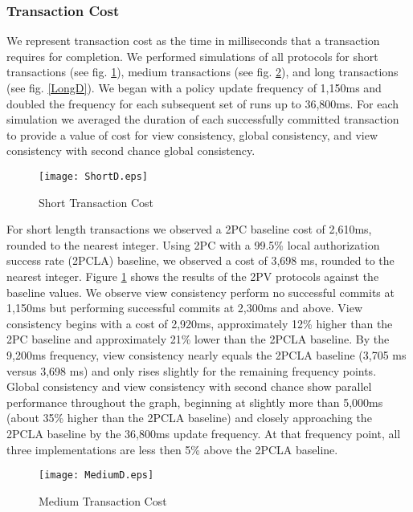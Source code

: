 \documentclass[11pt]{article}
\begin{document}
\subsubsection{Transaction Cost}
We represent transaction cost as the time in milliseconds that a transaction requires for completion. We performed simulations of all protocols for short transactions (see fig. \ref{ShortD}), medium transactions (see fig. \ref{MediumD}), and long transactions (see fig. \ref{LongD}). We began with a policy update frequency of 1,150ms and doubled the frequency for each subsequent set of runs up to 36,800ms. For each simulation we averaged the duration of each successfully committed transaction to provide a value of cost for view consistency, global consistency, and view consistency with second chance global consistency.
\begin{figure}[h]
\begin{center}
\texttt{[image: ShortD.eps]}
\caption{Short Transaction Cost}
\label{ShortD}
\end{center}
\end{figure}

For short length transactions we observed a 2PC baseline cost of 2,610ms, rounded to the nearest integer. Using 2PC with a 99.5\% local authorization success rate (2PCLA) baseline, we observed a cost of 3,698 ms, rounded to the nearest integer. Figure \ref{ShortD} shows the results of the 2PV protocols against the baseline values. We observe view consistency perform no successful commits at 1,150ms but performing successful commits at 2,300ms and above. View consistency begins with a cost of 2,920ms, approximately 12\% higher than the 2PC baseline and approximately 21\% lower than the 2PCLA baseline. By the 9,200ms frequency, view consistency nearly equals the 2PCLA baseline (3,705 ms versus 3,698 ms) and only rises slightly for the remaining frequency points. Global consistency and view consistency with second chance show parallel performance throughout the graph, beginning at slightly more than 5,000ms (about 35\% higher than the 2PCLA baseline) and closely approaching the 2PCLA baseline by the 36,800ms update frequency. At that frequency point, all three implementations are less then 5\% above the 2PCLA baseline.
\begin{figure}[h]
\begin{center}
\texttt{[image: MediumD.eps]}
\caption{Medium Transaction Cost}
\label{MediumD}
\end{center}
\end{figure}
\end{document}

